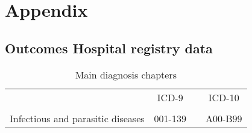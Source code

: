 \documentclass{scrartcl} %
\begin{document}
\newpage
\section{Appendix}
\subsection{Outcomes Hospital registry data}


\begin{table}[h] %
\begin{threeparttable}
\centering %
\caption{Main diagnosis chapters} %
\label{tab:outcomes_coding_main_chapters} 
\begin{tabular}{lrrr} %
\toprule %
&\multicolumn{1}{c}{ICD-9} & & \multicolumn{1}{c}{ICD-10} \\ 
\cmidrule(lr){2 -2} \cmidrule(lr){4 -4}
\\
\midrule
Infectious and parasitic diseases & 001-139 & & A00-B99 \\


\end{tabular}
\end{threeparttable}
\end{table}
\end{document}
